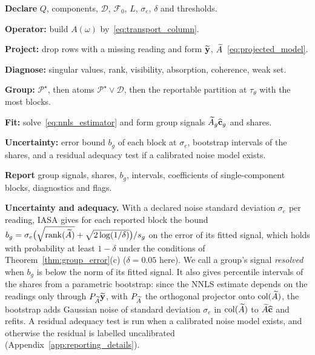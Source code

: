 \begin{algorithm}[t]
\caption{Identifiability-Aware Source Attribution (IASA)}
\label{alg:iasa}
\footnotesize
\begin{algsteps}
  \item \textbf{Declare} \(Q\), components, \(\mathcal D\), \(\mathcal F_0\), \(L\),
  \(\sigma_e\), \(\delta\) and thresholds.
  \item \textbf{Operator:} build \(A(\omega)\) by~\eqref{eq:transport_column}.
  \item \textbf{Project:} drop rows with a missing reading and form \(\widetilde{\mathbf y}\),
  \(\widetilde A\)~\eqref{eq:projected_model}.
  \item \textbf{Diagnose:} singular values, rank, visibility, absorption, coherence,
  weak set.
  \item \textbf{Group:} \(\mathcal P^\star\), then atoms \(\mathcal P^\star\vee\mathcal D\),
  then the reportable partition at \(\tau_\theta\) with the most blocks.
  \item \textbf{Fit:} solve~\eqref{eq:nnls_estimator} and form group signals
  \(\widetilde A_g\widehat{\mathbf c}_g\) and shares.
  \item \textbf{Uncertainty:} error bound \(b_g\) of each block at \(\sigma_e\), bootstrap
  intervals of the shares, and a residual adequacy test if a calibrated noise model
  exists.
  \item \textbf{Report} group signals, shares, \(b_g\), intervals, coefficients of
  single-component blocks, diagnostics and flags.
\end{algsteps}
\end{algorithm}

\noindent\textbf{Uncertainty and adequacy.}
With a declared noise standard deviation \(\sigma_e\) per reading, IASA gives for each
reported block the bound
\(b_g=\sigma_e\bigl(\sqrt{\operatorname{rank}(\widetilde A)}+\sqrt{2\log(1/\delta)}\bigr)/s_g\) on
the error of its fitted signal, which holds with probability at least \(1-\delta\)
under the conditions of Theorem~\ref{thm:group_error}(c) (\(\delta=0.05\) here).  We
call a group's signal \emph{resolved} when \(b_g\) is below the norm of its fitted
signal.  It also gives percentile intervals
of the shares from a parametric bootstrap: since the NNLS estimate depends on the
readings only through \(P_{\widetilde A}\widetilde{\mathbf y}\), with \(P_{\widetilde A}\) the orthogonal projector onto
\(\operatorname{col}(\widetilde A)\), the bootstrap adds Gaussian noise of standard
deviation \(\sigma_e\) in \(\operatorname{col}(\widetilde A)\) to \(\widetilde A\widehat{\mathbf c}\) and
refits.  A residual adequacy test is run when a calibrated noise model exists,
and otherwise the residual is labelled uncalibrated (Appendix~\ref{app:reporting_details}).
